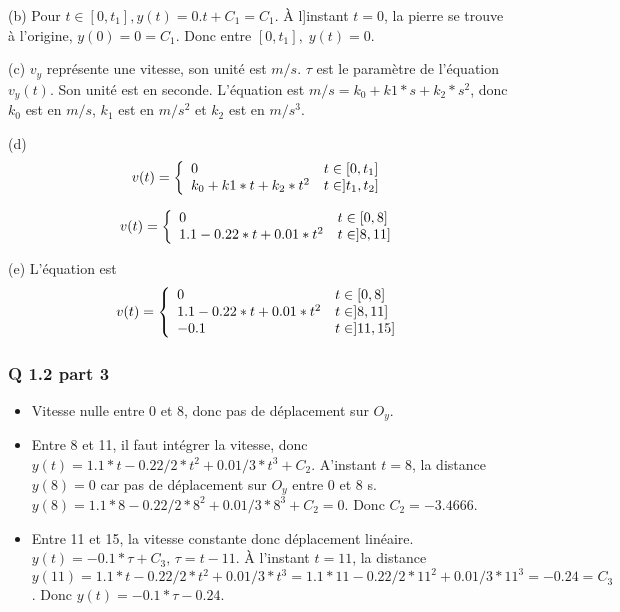 \documentclass[]{book}
\theoremstyle{definition}
\begin{document}
(b) Pour $t \in [0,t_1], y(t) = 0.t+C_1=C_1$. \`A l]instant $t=0$, la pierre se trouve \`a l'origine, $y(0)= 0 = C_1$. Donc entre $[0,t_1], \; y(t) = 0$. 

(c) $v_y$ repr\'esente une vitesse, son unit\'e est $m/s$. $\tau$ est le param\`etre de 
l'\'equation $v_y(t)$. Son unit\'e est en seconde. L'\'equation est $m/s = k_0 + k1*s + k_2*s^2$, 
donc $k_0$ est en $m/s$, $k_1$ est en $m/s^2$ et $k_2$ est en $m/s^3$.

(d)
$$ v(t) =
\left\{ 
\begin{array}{l l}
0 &  t \in [0,t_1] \\
k_0 + k1*t + k_2*t^2  &  t \in ]t_1,t_2]\\
\end{array}
\right. 
$$

$$ v(t) =
\left\{ 
\begin{array}{l l}
0 &  t \in [0,8] \\
1.1 - 0.22*t + 0.01*t^2  &  t \in ]8,11] \\
\end{array}
\right. 
$$

(e) L'\'equation est
$$ v(t) =
\left\{ 
\begin{array}{l l}
0 &  t \in [0,8] \\
1.1 - 0.22*t + 0.01*t^2  &  t \in ]8,11] \\
-0.1  &  t \in ]11,15] \\
\end{array}
\right. 
$$

\subsubsection*{Q 1.2 part 3}
\begin{itemize}
\item Vitesse nulle entre 0 et 8, donc pas de d\'eplacement sur $O_y$.
\item Entre 8 et 11, il faut int\'egrer la vitesse, donc $y(t) = 1.1*t - 0.22/2*t^2 + 
0.01/3*t^3 + C_2$. A'instant $t=8$, la distance $y(8) = 0$ car pas de d\'eplacement 
sur $O_y$ entre 0 et 8 s. $y(8) = 1.1*8 - 0.22/2*8^2 + 0.01/3*8^3 + C_2 = 0$. Donc $C_2 = -3.4666$.
\item Entre 11 et 15, la vitesse constante donc d\'eplacement lin\'eaire. $y(t) = -0.1*\tau+C_3, \, \tau = t-11$. \`A l'instant $t=11$, la distance $y(11) =  1.1*t - 0.22/2*t^2 + 0.01/3*t^3 = 1.1*11 - 0.22/2*11^2 + 0.01/3*11^3 = -0.24 = C_3$. Donc $y(t) = -0.1*\tau-0.24$.

\end{itemize}
\end{document}
